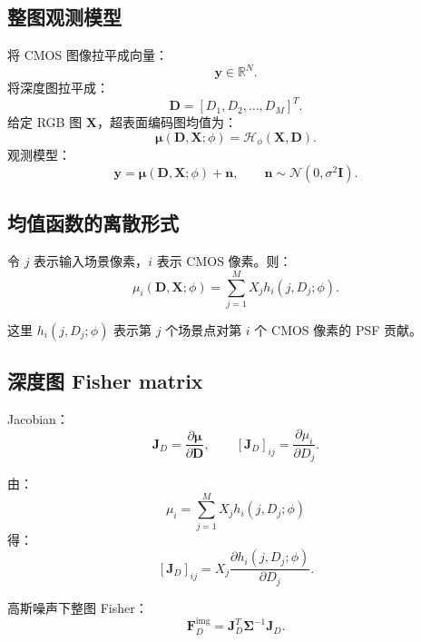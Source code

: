 \documentclass[11pt,a4paper,fontset=none]{ctexart}
\begin{document}
\subsection{整图观测模型}

将 CMOS 图像拉平成向量：
\begin{equation}
  \bm y\in\mathbb R^N.
\end{equation}
将深度图拉平成：
\begin{equation}
  \bm D=[D_1,D_2,\ldots,D_M]^T.
\end{equation}
给定 RGB 图 $\bm X$，超表面编码图均值为：
\begin{equation}
  \bm\mu(\bm D,\bm X;\phi)=\mathcal H_\phi(\bm X,\bm D).
\end{equation}
观测模型：
\begin{equation}
  \bm y=
  \bm\mu(\bm D,\bm X;\phi)+\bm n,\qquad
  \bm n\sim\mathcal N(0,\sigma^2\bm I).
\end{equation}

\subsection{均值函数的离散形式}

令 $j$ 表示输入场景像素，$i$ 表示 CMOS 像素。则：
\begin{equation}
  \mu_i(\bm D,\bm X;\phi)
  =
  \sum_{j=1}^{M}
  X_j
  h_i(j,D_j;\phi).
\end{equation}

这里 $h_i(j,D_j;\phi)$ 表示第 $j$ 个场景点对第 $i$ 个 CMOS 像素的 PSF 贡献。

\subsection{深度图 Fisher matrix}

Jacobian：
\begin{equation}
  \bm J_D=
  \frac{\partial\bm\mu}{\partial\bm D},
  \qquad
  [\bm J_D]_{ij}
  =
  \frac{\partial\mu_i}{\partial D_j}.
\end{equation}

由：
\begin{equation}
  \mu_i=
  \sum_{j=1}^{M}
  X_j h_i(j,D_j;\phi)
\end{equation}
得：
\begin{equation}
\boxed{
  [\bm J_D]_{ij}
  =
  X_j
  \frac{\partial h_i(j,D_j;\phi)}{\partial D_j}.
}
\end{equation}

高斯噪声下整图 Fisher：
\begin{equation}
\boxed{
  \bm F_D^{\mathrm{img}}
  =
  \bm J_D^T
  \bm\Sigma^{-1}
  \bm J_D.
}
\end{equation}
\end{document}
